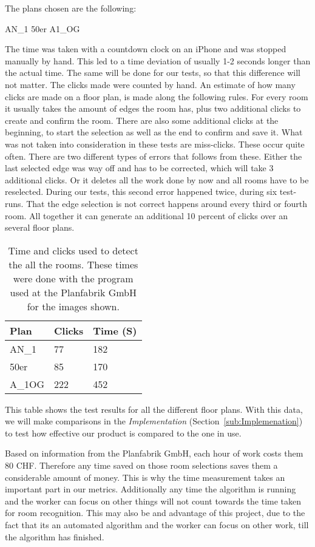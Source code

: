 The plans chosen are the following:

AN\_1
50er
A1\_OG



The time was taken with a countdown clock on an iPhone and was stopped manually by hand. This led to a time deviation of usually 1-2 seconds longer than the actual time. The same will be done for our tests, so that this difference will not matter. The clicks made were counted by hand.
An estimate of how many clicks are made on a floor plan, is made along the following rules. For every room it usually takes the amount of edges the room has, plus two additional clicks to create and confirm the room. There are also some additional clicks at the beginning, to start the selection as well as the end to confirm and save it.
What was not taken into consideration in these tests are miss-clicks. These occur quite often. There are two different types of errors that follows from these. Either the last selected edge was way off and has to be corrected, which will take 3 additional clicks. Or it deletes all the work done by now and all rooms have to be reselected. During our tests, this second error happened twice, during six test-runs. That the edge selection is not correct happens around every third or fourth room. All together it can generate an additional 10 percent of clicks over an several floor plans.

\begin{table}[]
	\centering
	\begin{tabular}{@{}lll@{}}
		\toprule
		Plan          & Clicks & Time (S) \\ \midrule
		AN\_1         & 77     & 182 \\
		50er          & 85     & 170  \\
		A\_1OG        & 222    & 452 \\ \bottomrule
	\end{tabular}
\caption{Time and clicks used to detect the all the rooms. These times were done with the program used at the Planfabrik GmbH for the images shown. }
\end{table}

This table shows the test results for all the different floor plans. With this data, we will make comparisons in the \textit{Implementation} (Section~\ref{sub:Implemenation}) to test how effective our product is compared to the one in use.

Based on information from the Planfabrik GmbH, each hour of work costs them 80 CHF. Therefore any time saved on those room selections saves them a considerable amount of money. This is why the time measurement takes an important part in our metrics. Additionally any time the algorithm is running and the worker can focus on other things will not count towards the time taken for room recognition. This may also be and advantage of this project, due to the fact that its an automated algorithm and the worker can focus on other work, till the algorithm has finished.

